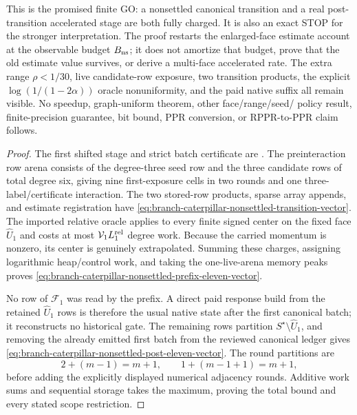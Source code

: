 \begin{theorem}
This is the promised finite GO: a nonsettled canonical transition and a real
post-transition accelerated stage are both fully charged.  It is also an
exact STOP for the stronger interpretation.  The proof restarts the
enlarged-face estimate account at the observable budget $B_{\rm ns}$; it does
not amortize that budget, prove that the old estimate value survives, or
derive a multi-face accelerated rate.  The extra range $\rho<1/30$, live
candidate-row exposure, two transition products, the explicit
$\log(1/(1-2\alpha))$ oracle nonuniformity, and the paid native suffix all
remain visible.  No speedup, graph-uniform theorem, other face/range/seed/
policy result, finite-precision guarantee, bit bound, PPR conversion, or
RPPR-to-PPR claim follows.
\end{theorem}

\begin{proof}
The first shifted stage and strict batch certificate are
.  The preinteraction
row arena consists of the degree-three seed row and the three candidate rows
of total degree six, giving nine first-exposure cells in two rounds and one
three-label/certificate interaction.  The two stored-row products, sparse
array appends, and estimate registration have
\cref{eq:branch-caterpillar-nonsettled-transition-vector}.  The imported
relative oracle applies to every finite signed center on the fixed face
$\widehat U_1$ and costs at most $\mathcal V_1L_1^{\rm rel}$ degree work.
Because the carried momentum is nonzero, its center is genuinely
extrapolated.  Summing these charges, assigning logarithmic heap/control work,
and taking the one-live-arena memory peaks proves
\cref{eq:branch-caterpillar-nonsettled-prefix-eleven-vector}.

No row of $\mathcal F_1$ was read by the prefix.  A direct paid response build
from the retained $\widehat U_1$ rows is therefore the usual native state
after the first canonical batch; it reconstructs no historical gate.  The
remaining rows partition $S^\star\setminus\widehat U_1$, and removing the
already emitted first batch from the reviewed canonical ledger gives
\cref{eq:branch-caterpillar-nonsettled-post-eleven-vector}.  The round
partitions are
\[
 2+(m-1)=m+1,
 \qquad 1+(m-1+1)=m+1,
\]
before adding the explicitly displayed numerical adjacency rounds.  Additive
work sums and sequential storage takes the maximum, proving the total bound
and every stated scope restriction.
\end{proof}
